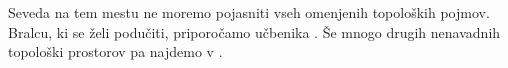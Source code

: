 \documentclass[10pt]{article}
\theoremstyle{definition}
\begin{document}
\noindent Seveda na tem mestu ne moremo pojasniti vseh omenjenih topoloških pojmov.
Bralcu, ki se želi podučiti, priporočamo učbenika \cite{mrcun08,dugindji66}. 
Še mnogo drugih nenavadnih topološki prostorov pa najdemo v \cite{steen78}.



\end{document}
